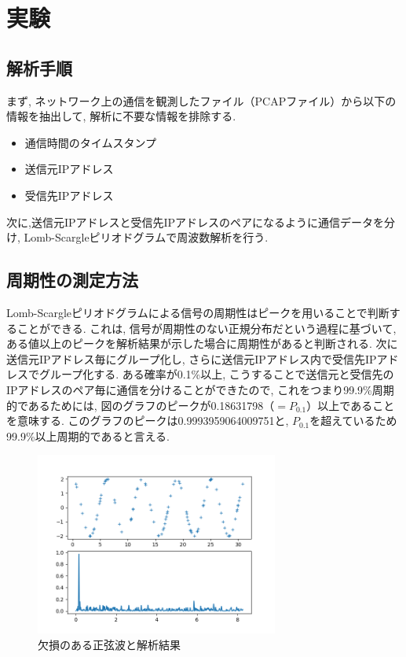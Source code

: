 \documentclass[twocolumn,10pt]{ltjsarticle}
\begin{document}
\section{実験}
\subsection{解析手順}
まず, ネットワーク上の通信を観測したファイル（PCAPファイル）から以下の情報を抽出して,
解析に不要な情報を排除する. 

\begin{itemize}
    \item 通信時間のタイムスタンプ
    \item 送信元IPアドレス
    \item 受信先IPアドレス
\end{itemize}

次に,送信元IPアドレスと受信先IPアドレスのペアになるように通信データを分け, 
Lomb-Scargleピリオドグラムで周波数解析を行う. 

\subsection{周期性の測定方法}
Lomb-Scargleピリオドグラムによる信号の周期性はピークを用いることで判断することができる. 
これは, 信号が周期性のない正規分布だという過程に基づいて, 
ある値以上のピークを解析結果が示した場合に周期性があると判断される. 
次に送信元IPアドレス毎にグループ化し, さらに送信元IPアドレス内で受信先IPアドレスでグループ化する. ある確率が0.1\%以上, 
こうすることで送信元と受信先のIPアドレスのペア毎に通信を分けることができたので, 
これをつまり99.9\%周期的であるためには, 図のグラフのピークが0.18631798（${=P_{0.1}}$）以上であることを意味する. 
このグラフのピークは0.9993959064009751と, ${P_{0.1}}$を超えているため99.9\%以上周期的であると言える. 

\begin{figure}[htb]
    \centering
    \includegraphics[width=8cm]{images/【実験】LombScargleピリオドグラムによるBOS2016の解析/lombscargle.png}
    \caption{欠損のある正弦波と解析結果}
    \label{fig:lombscargle}
\end{figure}
\end{document}
